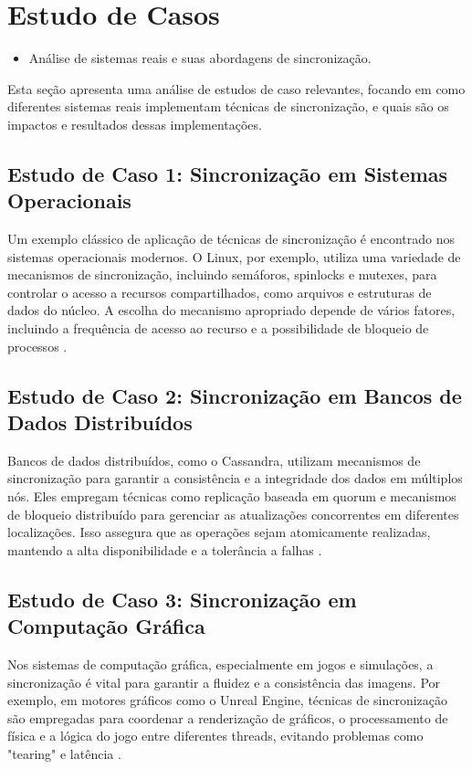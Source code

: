 \documentclass[conference]{IEEEtran}
\begin{document}
\section{Estudo de Casos}
\begin{itemize}
    \item Análise de sistemas reais e suas abordagens de sincronização.
\end{itemize}

Esta seção apresenta uma análise de estudos de caso relevantes, 
focando em como diferentes sistemas reais implementam técnicas de sincronização, 
e quais são os impactos e resultados dessas implementações.

\subsection{Estudo de Caso 1: Sincronização em Sistemas Operacionais}
Um exemplo clássico de aplicação de técnicas de sincronização 
é encontrado nos sistemas operacionais modernos. 
O Linux, por exemplo, utiliza uma variedade de mecanismos de sincronização, 
incluindo semáforos, spinlocks e mutexes, para controlar o acesso 
a recursos compartilhados, como arquivos e estruturas de dados do núcleo. 
A escolha do mecanismo apropriado depende de vários fatores, 
incluindo a frequência de acesso ao recurso e a 
possibilidade de bloqueio de processos \cite{love2010linux}.

\subsection{Estudo de Caso 2: Sincronização em Bancos de Dados Distribuídos}
Bancos de dados distribuídos, como o Cassandra, 
utilizam mecanismos de sincronização para garantir a consistência e 
a integridade dos dados em múltiplos nós. 
Eles empregam técnicas como replicação baseada em quorum e 
mecanismos de bloqueio distribuído para gerenciar as atualizações 
concorrentes em diferentes localizações. 
Isso assegura que as operações sejam atomicamente realizadas, 
mantendo a alta disponibilidade e a tolerância a falhas \cite{lakshman2010cassandra}.

\subsection{Estudo de Caso 3: Sincronização em Computação Gráfica}
Nos sistemas de computação gráfica, especialmente em jogos e simulações, 
a sincronização é vital para garantir a fluidez e a consistência das imagens. 
Por exemplo, em motores gráficos como o Unreal Engine, 
técnicas de sincronização são empregadas para coordenar a renderização de gráficos, 
o processamento de física e a lógica do jogo entre diferentes threads, 
evitando problemas como "tearing" e latência \cite{gregory2014game}.
\end{document}
